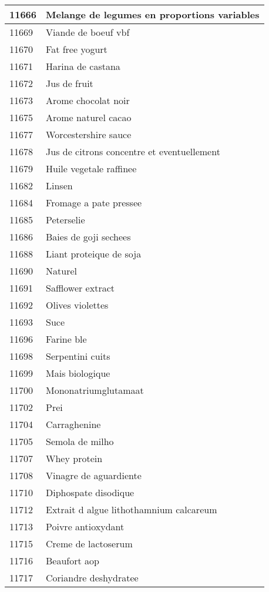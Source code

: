 \begin{longtable}{|l|l|}
11666 & Melange de legumes en proportions variables \\ \hline 
11669 & Viande de boeuf vbf \\ \hline 
11670 & Fat free yogurt \\ \hline 
11671 & Harina de castana \\ \hline 
11672 & Jus de fruit \\ \hline 
11673 & Arome chocolat noir \\ \hline 
11675 & Arome naturel cacao \\ \hline 
11677 & Worcestershire sauce \\ \hline 
11678 & Jus de citrons concentre et eventuellement \\ \hline 
11679 & Huile vegetale raffinee \\ \hline 
11682 & Linsen \\ \hline 
11684 & Fromage a pate pressee \\ \hline 
11685 & Peterselie \\ \hline 
11686 & Baies de goji sechees \\ \hline 
11688 & Liant proteique de soja \\ \hline 
11690 & Naturel \\ \hline 
11691 & Safflower extract \\ \hline 
11692 & Olives violettes \\ \hline 
11693 & Suce \\ \hline 
11696 & Farine ble \\ \hline 
11698 & Serpentini cuits \\ \hline 
11699 & Mais biologique \\ \hline 
11700 & Mononatriumglutamaat \\ \hline 
11702 & Prei \\ \hline 
11704 & Carraghenine \\ \hline 
11705 & Semola de milho \\ \hline 
11707 & Whey protein \\ \hline 
11708 & Vinagre de aguardiente \\ \hline 
11710 & Diphospate disodique \\ \hline 
11712 & Extrait d algue lithothamnium calcareum \\ \hline 
11713 & Poivre antioxydant \\ \hline 
11715 & Creme de lactoserum \\ \hline 
11716 & Beaufort aop \\ \hline 
11717 & Coriandre deshydratee \\ \hline 

\end{longtable}
